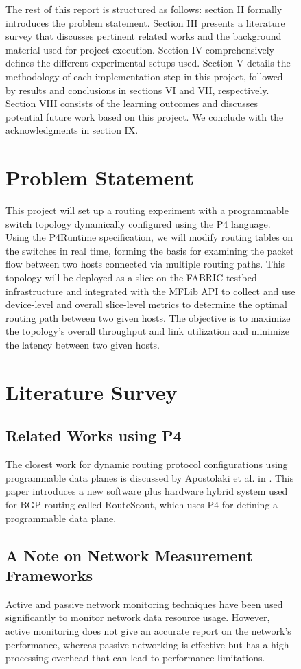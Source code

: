 \documentclass[conference]{IEEEtran}
\begin{document}
\begin{figure}[h!]
    The rest of this report is structured as follows: section II formally introduces the problem statement. Section III presents a literature survey that discusses pertinent related works and the background material used for project execution. Section IV comprehensively defines the different experimental setups used. Section V details the methodology of each implementation step in this project, followed by results and conclusions in sections VI and VII, respectively. Section VIII consists of the learning outcomes and discusses potential future work based on this project. We conclude with the acknowledgments in section IX.

    \section{Problem Statement}
    This project will set up a routing experiment with a  programmable switch topology dynamically configured using the P4 language. Using the P4Runtime specification, we will modify routing tables on the switches in real time, forming the basis for examining the packet flow between two hosts connected via multiple routing paths. This topology will be deployed as a slice on the FABRIC testbed infrastructure and integrated with the MFLib API to collect and use device-level and overall slice-level metrics to determine the optimal routing path between two given hosts. The objective is to maximize the topology's overall throughput and link utilization and minimize the latency between two given hosts.

    \section{Literature Survey}
    \subsection{Related Works using P4}
    The closest work for dynamic routing protocol configurations using programmable data planes is discussed by Apostolaki et al. in \cite{b4}. This paper introduces a new software plus hardware hybrid system used for BGP routing called RouteScout, which uses P4 for defining a programmable data plane.

    \subsection{A Note on Network Measurement Frameworks}
    Active and passive network monitoring techniques have been used significantly to monitor network data resource usage. However, active monitoring does not give an accurate report on the network’s performance, whereas passive networking is effective but has a high processing overhead that can lead to performance limitations.


\end{figure}
\end{document}
